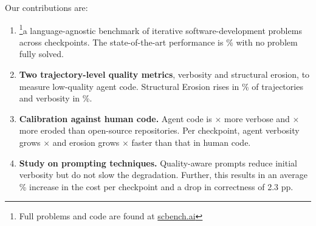 Our contributions are:
\begin{enumerate}[leftmargin=*,itemsep=0pt]
    \item \textbf{\scb{}} \footnote{Full problems and code are found at \href{https://www.scbench.ai}{scbench.ai}}a language-agnostic benchmark of \transProblems{} iterative software-development problems across \overallTotalCheckpoints{} checkpoints. The state-of-the-art performance is \overallBestStrictSolveRate{}\% with no problem fully solved.
    \item \textbf{Two trajectory-level quality metrics}, verbosity and structural erosion, to measure low-quality agent code. Structural Erosion rises in \erosionPctIncreasing{}\% of trajectories and verbosity in \vfTrajIncPct{}\%.
    \item \textbf{Calibration against human code.} Agent code is \avhAllVerbRatio{}$\times$ more verbose and \avhAllErosionRatio{}$\times$ more eroded than \avhPanelN{} open-source repositories. Per checkpoint, agent verbosity grows \avhAgentVerbSlopeRatio{}$\times$ and erosion grows \avhAgentErosSlopeRatio{}$\times$ faster than that in human code.
    \item \textbf{Study on prompting techniques.} Quality-aware prompts reduce initial verbosity but do not slow the degradation. Further, this results in an average \psRqCostIncreaseMean\% increase in the cost per checkpoint and a drop in correctness of 2.3 pp.
\end{enumerate}